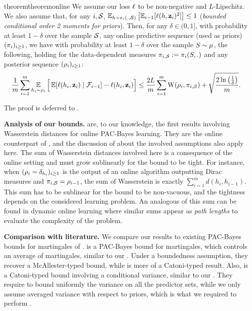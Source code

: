 \documentclass{article}
\begin{document}
\begin{restatable}{theorem}{theoremonline}
\label{theorem:online}
We assume our loss $\loss$ to be non-negative and $L$-Lipschitz.
We also assume that, for any $i,\S$, $\EE_{h\sim \P_{i}(.,\S)}\LB \EE_{i-1}[\loss(h,\z_i)^2] \RB \leq 1$ (\emph{bounded conditional order 2 moments for priors}).
Then, for any $\delta\in(0,1]$, with probability at least $1-\delta$ over the sample $\S$, any online predictive sequence (used as priors) $(\P_i)_{i\geq 1}$, we have with probability at least $1-\delta$ over the sample $S\sim\D$, the following, holding for the data-dependent measures $\P_{i,\S}\defeq \P_i(S,.)$ and any posterior sequence $(\Q_i)_{i\geq 1}$:
\begin{align*}
\frac{1}{m}\sum_{i=1}^m \EE_{h_i\sim \Q_{i}} \Big[\EE[\loss(h_i,\z_i) \mid \Fcal_{i-1}] - \loss(h_i,\z_i) \Big]  \le \frac{2L}{m}\sum_{i=1}^{m}\W(\Q_{i}, \P_{i,\S}) + \sqrt{\frac{2\ln\LP\frac{1}{\delta}\RP}{m}}.
\end{align*}
\end{restatable}
The proof is deferred to .

\textbf{Analysis of our bounds.} 
 are, to our knowledge, the first results involving Wasserstein distances for online PAC-Bayes learning.
They are the online counterpart of , and the discussion of  about the involved assumptions also apply here.
The sum of Wasserstein distances involved here is a consequence of the online setting and must grow sublinearly for the bound to be tight.
For instance, when $(\Q_i=\delta_{h_i})_{i\geq1}$ is the output of an online algorithm outputting Dirac measures and $\P_{i,\S}= \Q_{i-1}$, the sum of Wasserstein is exactly $\sum_{i=1}^m d(h_i,h_{i-1})$.
This sum has to be sublinear for the bound to be non-vacuous, and the tightness depends on the considered learning problem. 
An analogous of this sum can be found in dynamic online learning \cite{zinkevich2003online} where similar sums appear as \emph{path lengths} to evaluate the complexity of the problem.  

\textbf{Comparison with literature.}
We compare our results to existing PAC-Bayes bounds for martingales of \cite{seldin2012pac}. 
\cite[Theorem 4]{seldin2012pac} is a PAC-Bayes bound for martingales, which controls an average of martingales, similar to our .
Under a boundedness assumption, they recover a McAllester-typed bound, while  is more of a Catoni-typed result.
Also, \cite[Theorem 7]{seldin2012pac} is a Catoni-typed bound involving a conditional variance, similar to our .
They require to bound uniformly the variance on all the predictor sets, while we only assume averaged variance with respect to priors, which is what we required to perform .
\end{document}
